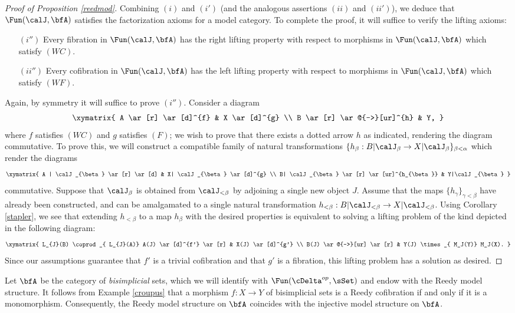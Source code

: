 \begin{Model Categories}
\begin{Didn't Read}
\begin{proof}[Proof of Proposition \ref{reedmod}]
Combining $(i)$ and $(i')$ (and the analogous assertions $(ii)$ and $(ii')$), we deduce that
$\Fun(\calJ, \bfA)$ satisfies the factorization axioms for a model category. To complete the proof, it will suffice to verify the lifting axioms:
\begin{itemize}
\item[$(i'')$] Every fibration in $\Fun(\calJ, \bfA)$ has the right lifting property with respect to
morphisms in $\Fun(\calJ, \bfA)$ which satisfy $(WC)$.
\item[$(ii'')$] Every cofibration in $\Fun(\calJ, \bfA)$ has the left lifting property with respect to morphisms in $\Fun(\calJ, \bfA)$ which satisfy $(WF)$.
\end{itemize}
Again, by symmetry it will suffice to prove $(i'')$. Consider a diagram
$$ \xymatrix{ A \ar[r] \ar[d]^{f} & X \ar[d]^{g} \\
B \ar[r] \ar@{-->}[ur]^{h} & Y, }$$
where $f$ satisfies $(WC)$ and $g$ satisfies $(F)$; we wish to prove that there
exists a dotted arrow $h$ as indicated, rendering the diagram commutative.
To prove this, we will construct a compatible family of natural transformations
$\{ h_{\beta}: B| \calJ_{\beta} \rightarrow X| \calJ_{\beta} \}_{ \beta < \alpha}$
which render the diagrams
$$ \xymatrix{ A | \calJ_{\beta} \ar[r] \ar[d] & X| \calJ_{\beta} \ar[d]^{g} \\
B| \calJ_{\beta} \ar[r] \ar[ur]^{h_{\beta}} & Y|\calJ_{\beta} }$$
commutative. Suppose that $\calJ_{\beta}$ is obtained from
$\calJ_{< \beta}$ by adjoining a single new object $J$. Assume that the maps
$\{ h_{\gamma} \}_{\gamma < \beta}$ have already been constructed, and can be amalgamated to a single natural transformation $h_{< \beta}: B | \calJ_{< \beta}
\rightarrow X| \calJ_{< \beta}$. Using Corollary \ref{stapler}, we see that extending
$h_{< \beta}$ to a map $h_{\beta}$ with the desired properties is equivalent to solving a lifting problem of the kind depicted in the following diagram:
$$ \xymatrix{ L_{J}(B) \coprod_{ L_{J}(A)} A(J) \ar[d]^{f'} \ar[r] & X(J) \ar[d]^{g'} \\
B(J) \ar@{-->}[ur] \ar[r] & Y(J) \times_{ M_J(Y)} M_J(X). }$$
Since our assumptions guarantee that $f'$ is a trivial cofibration and that $g'$ is a fibration, 
this lifting problem has a solution as desired.
\end{proof}

\begin{example}\label{tetsu}
Let $\bfA$ be the category of {\em bisimplicial} sets, which we will identify
with $\Fun( \cDelta^{op}, \sSet)$ and endow with the Reedy model structure.
It follows from Example \ref{croupus} that a morphism $f: X \rightarrow Y$ of bisimplicial sets is a Reedy cofibration if and only if it is a monomorphism. Consequently, the
Reedy model structure on $\bfA$ coincides with the injective model structure on $\bfA$.
\end{example}


\end{Didn't Read}
\end{Model Categories}
